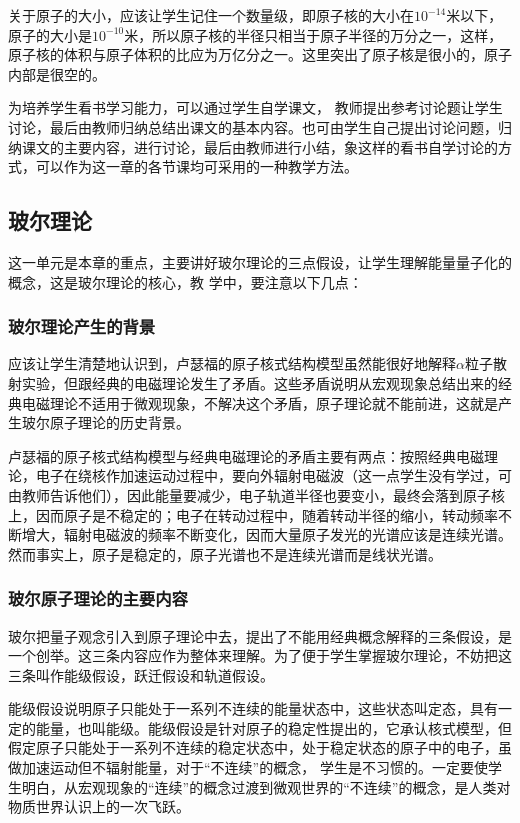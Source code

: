 关于原子的大小，应该让学生记住一个数量级，即原子核的大小在$10^{-14}$米以下，原子的大小是$10^{-10}$米，所以原子核的半径只相当于原子半径的万分之一，这样，原子核的体积与原子体积的比应为万亿分之一。这里突出了原子核是很小的，原子内部是很空的。

为培养学生看书学习能力，可以通过学生自学课文，
教师提出参考讨论题让学生讨论，最后由教师归纳总结出课文的基本内容。也可由学生自己提出讨论问题，归纳课文的主要内容，进行讨论，最后由教师进行小结，象这样的看书自学讨论的方式，可以作为这一章的各节课均可采用的一种教学方法。

\subsection{玻尔理论}
这一单元是本章的重点，主要讲好玻尔理论的三点假设，让学生理解能量量子化的概念，这是玻尔理论的核心，教
学中，要注意以下几点：

\subsubsection{玻尔理论产生的背景}

应该让学生清楚地认识到，卢瑟福的原子核式结构模型虽然能很好地解释$\alpha$粒子散射实验，但跟经典的电磁理论发生了矛盾。这些矛盾说明从宏观现象总结出来的经典电磁理论不适用于微观现象，不解决这个矛盾，原子理论就不能前进，这就是产生玻尔原子理论的历史背景。

卢瑟福的原子核式结构模型与经典电磁理论的矛盾主要有两点：按照经典电磁理论，电子在绕核作加速运动过程中，要向外辐射电磁波（这一点学生没有学过，可由教师告诉他们），因此能量要减少，电子轨道半径也要变小，最终会落到原子核上，因而原子是不稳定的；电子在转动过程中，随着转动半径的缩小，转动频率不断增大，辐射电磁波的频率不断变化，因而大量原子发光的光谱应该是连续光谱。然而事实上，原子是稳定的，原子光谱也不是连续光谱而是线状光谱。

\subsubsection{玻尔原子理论的主要内容}
玻尔把量子观念引入到原子理论中去，提出了不能用经典概念解释的三条假设，是一个创举。这三条内容应作为整体来理解。为了便于学生掌握玻尔理论，不妨把这三条叫作能级假设，跃迁假设和轨道假设。

能级假设说明原子只能处于一系列不连续的能量状态中，这些状态叫定态，具有一定的能量，也叫能级。能级假设是针对原子的稳定性提出的，它承认核式模型，但假定原子只能处于一系列不连续的稳定状态中，处于稳定状态的原子中的电子，虽做加速运动但不辐射能量，对于“不连续”的概念，
学生是不习惯的。一定要使学生明白，从宏观现象的“连续”的概念过渡到微观世界的“不连续”的概念，是人类对物质世界认识上的一次飞跃。

